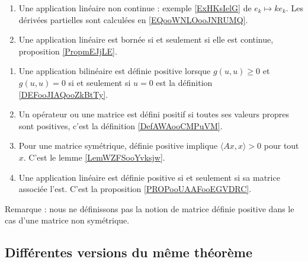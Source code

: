 \begin{enumerate}
    \item
        Une application linéaire non continue : exemple \ref{ExHKsIelG} de \( e_k\mapsto ke_k\). Les dérivées partielles sont calculées en \eqref{EQooWNLOooJNRUMQ}.
    \item
        Une application linéaire est bornée si et seulement si elle est continue, proposition \ref{PropmEJjLE}.
\end{enumerate}

\begin{enumerate}
    \item
        Une application bilinéaire est définie positive lorsque \( g(u,u)\geq 0\) et \( g(u,u)=0\) si et seulement si \( u=0\) est la définition \ref{DEFooJIAQooZkBtTy}.
    \item
        Un opérateur ou une matrice est défini positif si toutes ses valeurs propres sont positives, c'est la définition \ref{DefAWAooCMPuVM}.
    \item
        Pour une matrice symétrique, définie positive implique \( \langle Ax, x\rangle >0\) pour tout \( x\). C'est le lemme \ref{LemWZFSooYvksjw}.
    \item
        Une application linéaire est définie positive si et seulement si sa matrice associée l'est. C'est la proposition \ref{PROPooUAAFooEGVDRC}.
\end{enumerate}
Remarque : nous ne définissons pas la notion de matrice définie positive dans le cas d'une matrice non symétrique.

\subsection*{Différentes versions du même théorème}

